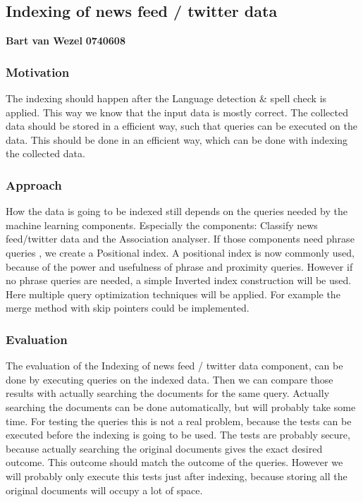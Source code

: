 \subsection{Indexing of news feed / twitter data   }
\textbf{Bart van Wezel}  \indent \textbf{0740608} 

\subsubsection*{Motivation}
The indexing should happen after the Language detection \& spell check is applied. This way we know that the input data is mostly correct.  The collected data should be stored in a efficient way, such that queries can be executed on the data. This should be done in an efficient way, which can be done with indexing the collected data. 

\subsubsection*{Approach}
How the data is going to be indexed still depends on the queries needed by the machine learning components. Especially the components: Classify news feed/twitter data and the Association analyser. If those components need phrase queries , we create a Positional index.  A positional index is now commonly used, because of the power and usefulness of phrase and proximity queries. However if no phrase queries are needed, a simple Inverted index construction will be used. Here multiple query optimization techniques will be applied. For example the merge method with skip pointers could be implemented. 

\subsubsection*{Evaluation }
The evaluation of the Indexing of news feed / twitter data component, can be done by executing queries on the indexed data. Then we can compare those results with actually searching the documents for the same query. Actually searching the documents can be done automatically, but will probably take some time. For testing the queries this is not a real problem, because the tests can be executed before the indexing is going to be used. The tests are probably secure, because actually searching the original documents gives the exact desired outcome. This outcome should match the outcome of the queries. However we will probably only execute this tests just after indexing, because storing all the original documents will occupy a lot of space. 
